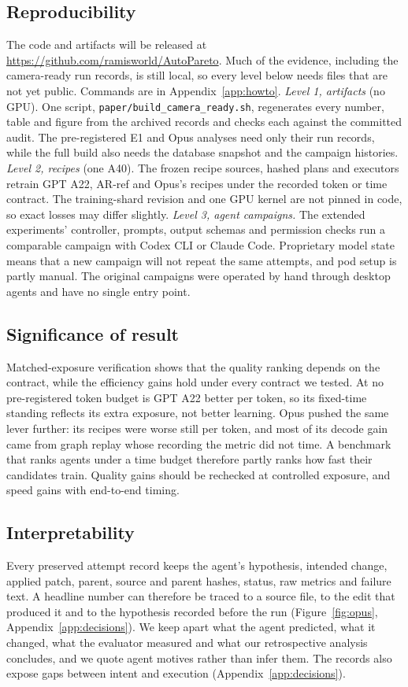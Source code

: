 \documentclass{article}
\newif\ifshowhumanmarkers \showhumanmarkersfalse
\newcommand{\humantag}[1]{{\color{humanframe}\sffamily\scriptsize\bfseries HUMAN AUTHOR MUST REWRITE/VERIFY [#1]}\ }
\newcommand{\humanauthor}[2][]{\ifshowhumanmarkers\begin{humanbox}\humantag{#1}#2\end{humanbox}\else #2\par\fi}
\begin{document}
\subsection{Reproducibility}\label{sec:reproduce}
\humanauthor[P2-17 r6]{The code and artifacts will be released at \url{https://github.com/ramisworld/AutoPareto}. Much of the evidence, including the camera-ready run records, is still local, so every level below needs files that are not yet public. Commands are in Appendix~\ref{app:howto}. \emph{Level 1, artifacts} (no GPU). One script, \texttt{paper/build\_camera\_ready.sh}, regenerates every number, table and figure from the archived records and checks each against the committed audit. The pre-registered E1 and Opus analyses need only their run records, while the full build also needs the database snapshot and the campaign histories. \emph{Level 2, recipes} (one A40). The frozen recipe sources, hashed plans and executors retrain GPT A22, AR-ref and Opus's recipes under the recorded token or time contract. The training-shard revision and one GPU kernel are not pinned in code, so exact losses may differ slightly. \emph{Level 3, agent campaigns.} The extended experiments' controller, prompts, output schemas and permission checks run a comparable campaign with Codex CLI or Claude Code. Proprietary model state means that a new campaign will not repeat the same attempts, and pod setup is partly manual. The original campaigns were operated by hand through desktop agents and have no single entry point.}

\subsection{Significance of result}
\humanauthor[P2-12 r6]{Matched-exposure verification shows that the quality ranking depends on the contract, while the efficiency gains hold under every contract we tested. At no pre-registered token budget is GPT A22 better per token, so its fixed-time standing reflects its extra exposure, not better learning. Opus pushed the same lever further: its recipes were worse still per token, and most of its decode gain came from graph replay whose recording the metric did not time. A benchmark that ranks agents under a time budget therefore partly ranks how fast their candidates train. Quality gains should be rechecked at controlled exposure, and speed gains with end-to-end timing.}

\subsection{Interpretability}
\humanauthor[P2-13 r6]{Every preserved attempt record keeps the agent's hypothesis, intended change, applied patch, parent, source and parent hashes, status, raw metrics and failure text. A headline number can therefore be traced to a source file, to the edit that produced it and to the hypothesis recorded before the run (Figure~\ref{fig:opus}, Appendix~\ref{app:decisions}). We keep apart what the agent predicted, what it changed, what the evaluator measured and what our retrospective analysis concludes, and we quote agent motives rather than infer them. The records also expose gaps between intent and execution (Appendix~\ref{app:decisions}).}
\end{document}
